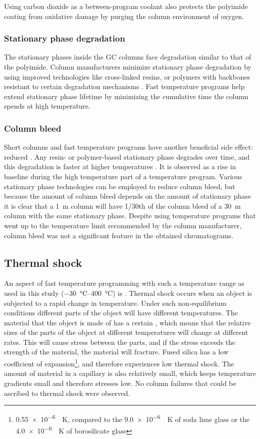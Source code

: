 Using carbon dioxide as a between-program coolant also protects the polyimide
coating from oxidative damage by purging the column environment of oxygen.

\subsubsection{Stationary phase degradation}

The stationary phases inside the GC columns face degradation similar to that of
the polyimide. Column manufacturers minimize sta\-tion\-ary phase degradation by
using improved technologies like cross-linked resins, or polymers with backbones
resistant to certain degradation mechanisms \autocite{Day2003}.
Fast temperature programs help extend stationary phase lifetime by minimizing
the cumulative time the column spends at high temperature.

\subsubsection{Column bleed}
Short columns and fast temperature programs have another beneficial side effect:
reduced . Any resin- or polymer-based stationary phase
degrades over time, and this degradation is faster at higher temperatures
\autocite[p. 66]{Mcnair2019}. It is observed as a rise in baseline during the
high temperature part of a temperature program. Various stationary phase
technologies can be employed to reduce column bleed, but because the amount of
column bleed depends on the amount of stationary phase it is clear that a
\SI{1}{\metre} column will have \num{1/30}th of the column bleed of a
\SI{30}{\metre} column with the same stationary phase. Despite using temperature
programs that went up to the temperature limit recommended by the column
manufacturer, column bleed was not a significant feature in the obtained
chromatograms.

\subsection{Thermal shock}
An aspect of fast temperature programming with such a temperature range as used
in this study (\SIrange{-30}{400}{\celsius}) is . Thermal
shock occurs when an object is subjected to a rapid change in temperature. Under
such non-equilibrium conditions different parts of the object will have
different temperatures. The material that the object is made of has a certain
, which means that the relative sizes
of the parts of the object at different temperatures will change at different
rates. This will cause stress between the parts, and if the stress exceeds the
strength of the material, the material will fracture. Fused silica has a low
coefficient of expansion\footnote{\SI{0.55e-6}{\per\kelvin}, compared to the
\SI{9.0e-6}{\per\kelvin} of soda lime glass or the \SI{4.0e-6}{\per\kelvin} of
borosilicate glass}, and therefore experiences low thermal shock. The amount of
material in a capillary is also relatively small, which keeps temperature
gradients small and therefore stresses low. No column failures that could be
ascribed to thermal shock were observed.

